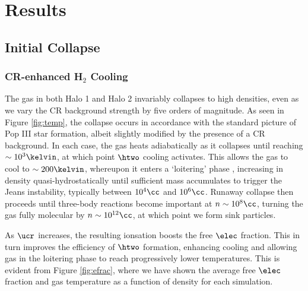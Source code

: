 \section{Results}
\label{sec:results}
\subsection{Initial Collapse}
\subsubsection{CR-enhanced H$_2$ Cooling}
\label{sec:initial_collapse}

The gas in both Halo 1 and Halo 2 invariably collapses to high densities, even as we vary the CR background strength by five orders of magnitude. As seen in Figure \ref{fig:temp}, the collapse occurs in accordance with the standard picture of Pop III star formation, albeit slightly modified by the presence of a CR background.  In each case, the gas heats adiabatically as it collapses until reaching $\sim10^3\kelvin$, at which point $\htwo$ cooling activates.  This allows the gas to cool to $\sim200\kelvin$, whereupon it enters a `loitering' phase \citep{BrommCoppiLarson2002}, increasing in density quasi-hydrostatically until sufficient mass accumulates to trigger the Jeans instability, typically between $10^4\cc$ and $10^6\cc$. Runaway collapse then proceeds until three-body reactions become important at $n\sim10^8\cc$, turning the gas fully molecular by $n\sim10^{12}\cc$, at which point we form sink particles.

As $\ucr$ increases, the resulting ionsation boosts the free $\elec$ fraction.  This in turn improves the efficiency of $\htwo$ formation, enhancing cooling and allowing gas in the loitering phase to reach progressively lower temperatures.  This is evident from Figure \ref{fig:efrac}, where we have shown the average free $\elec$ fraction and gas temperature as a function of density for each simulation. 